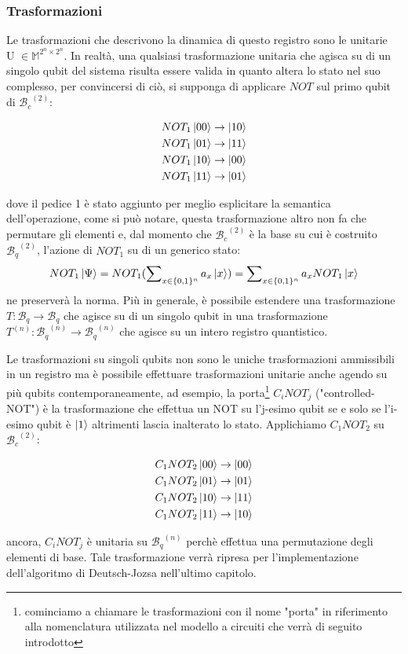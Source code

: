\documentclass[12pt,a4paper,openright]{report}
\begin{document}
\subsubsection{Trasformazioni}

Le trasformazioni che descrivono la dinamica di questo registro sono le unitarie \\U $\in \mathbb{M}^{2^n\times2^n}$.
In realtà, una qualsiasi trasformazione unitaria che agisca su di un singolo qubit del sistema risulta essere valida in quanto altera lo stato nel suo complesso,
per convincersi di ciò, si supponga di applicare $NOT$ sul primo qubit di ${\mathcal{B}_c}^{(2)}$:
\begin{center}
    \begin{align*}
        &NOT_1\ket{00} \rightarrow  \ket{10} \\
        &NOT_1\ket{01} \rightarrow  \ket{11} \\
        &NOT_1\ket{10} \rightarrow  \ket{00} \\
        &NOT_1\ket{11} \rightarrow  \ket{01}
    \end{align*}
\end{center}
dove il pedice 1 è stato aggiunto per meglio esplicitare la semantica dell'operazione, come si può notare, questa trasformazione altro non fa che permutare gli elementi
e, dal momento che ${\mathcal{B}_c}^{(2)}$ è la base su cui è costruito ${\mathcal{B}_q}^{(2)}$, l'azione di $NOT_1$ su di un generico stato:
\[
    NOT_1\ket{\Psi} = NOT_1(\sum\nolimits_{x \in \{0,1\}^{n}} a_x \ket{x}) = \sum\nolimits_{x \in \{0,1\}^{n}} a_x NOT_1\ket{x}
\] 
ne preserverà la norma. Più in generale, è possibile estendere una trasformazione $T: \mathcal{B}_q \rightarrow \mathcal{B}_q$ che agisce su di un singolo qubit
in una trasformazione $T^{(n)}: {\mathcal{B}_q}^{(n)} \rightarrow {\mathcal{B}_q}^{(n)}$ che agisce su un intero registro quantistico.\par
Le trasformazioni su singoli qubits non sono le uniche trasformazioni ammissibili in un registro ma è possibile effettuare trasformazioni unitarie anche agendo su più qubits contemporaneamente,
ad esempio, la porta\footnote{cominciamo a chiamare le trasformazioni con il nome "porta" in riferimento alla nomenclatura utilizzata nel modello a circuiti che verrà di seguito introdotto} 
$C_iNOT_j$ ("controlled-NOT") è la trasformazione che effettua un NOT su l'j-esimo qubit se e solo se l'i-esimo qubit è $\ket1$ altrimenti lascia inalterato lo stato. Applichiamo $C_1NOT_2$ su ${\mathcal{B}_c}^{(2)}$:
\begin{center}
    \begin{align*}
        &C_1NOT_2\ket{00} \rightarrow  \ket{00} \\
        &C_1NOT_2\ket{01} \rightarrow  \ket{01} \\
        &C_1NOT_2\ket{10} \rightarrow  \ket{11} \\
        &C_1NOT_2\ket{11} \rightarrow  \ket{10}
    \end{align*}
\end{center}
ancora, $C_iNOT_j$ è unitaria su ${\mathcal{B}_q}^{(n)}$ perchè effettua una permutazione degli elementi di base. Tale trasformazione verrà ripresa per l'implementazione dell'algoritmo di Deutsch-Jozsa nell'ultimo
capitolo.
\end{document}
